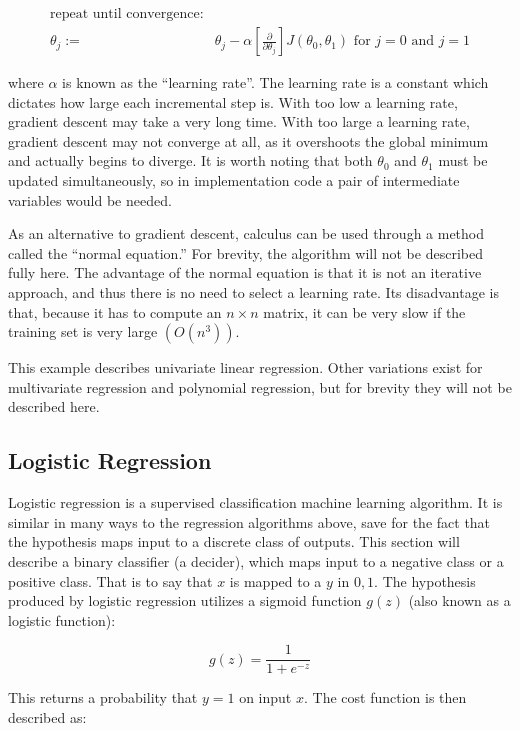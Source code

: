 \begin{align*} 
\text{repeat until convergence:} & \\
\theta_j := & \theta_j - \alpha[\frac{\partial}{\partial\theta_j}]J(\theta_0, \theta_1) \text{ for } j = 0 \text{ and } j = 1
\end{align*} 


where \(\alpha\) is known as the ``learning rate''. The learning rate is a constant which dictates how large each incremental step is. With too low a learning rate, gradient descent may take a very long time. With too large a learning rate, gradient descent may not converge at all, as it overshoots the global minimum and actually begins to diverge. It is worth noting that both \(\theta_0\) and \(\theta_1\) must be updated simultaneously, so in implementation code a pair of intermediate variables would be needed.

As an alternative to gradient descent, calculus can be used through a method called the ``normal equation.'' For brevity, the algorithm will not be described fully here. The advantage of the normal equation is that it is not an iterative approach, and thus there is no need to select a learning rate. Its disadvantage is that, because it has to compute an \(n \times n\) matrix, it can be very slow if the training set is very large \((O(n^3))\).

This example describes univariate linear regression. Other variations exist for multivariate regression and polynomial regression, but for brevity they will not be described here. 


\subsection{Logistic Regression}

Logistic regression is a supervised classification machine learning algorithm. It is similar in many ways to the regression algorithms above, save for the fact that the hypothesis maps input to a discrete class of outputs. This section will describe a binary classifier (a decider), which maps input to a negative class or a positive class. That is to say that \(x\) is mapped to a \(y\) in \({0, 1}\). The hypothesis produced by logistic regression utilizes a sigmoid function \(g(z)\) (also known as a logistic function):

\[g(z)=\frac{1}{1+e^{-z}}\]

This returns a probability that \(y = 1\) on input \(x\). The cost function is then described as:


